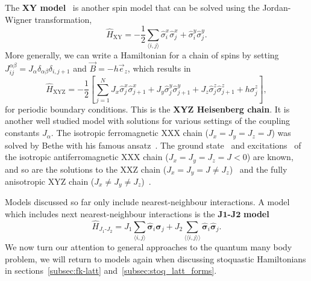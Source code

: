 The \textbf{XY model}~\cite{lieb1961two} is another spin model that can be solved using the Jordan-Wigner transformation,
\begin{equation}
	\label{eq:h-xy}
\hat H_{\text{XY}}=-\frac{1}{2} \sum_{\langle i, j\rangle} \hat\sigma_{i}^{x} \hat\sigma_{j}^{x}+\hat\sigma_{i}^{y} \hat\sigma_{j}^{y}.
\end{equation}
More generally, we can write a Hamiltonian for a chain of spins by setting $J_{i j}^{\alpha \beta} = J_\alpha \delta_{\alpha \beta} \delta_{i, j+1}$ and $\vec{B} = -h \vec{e}_z$, which results in
\begin{equation}
	\label{eq:h-xyz}
	\hat H_{\text{XYZ}}= -\frac{1}{2}\left[ \sum_{j=1}^{N}J_{x} \hat \sigma_{j}^{x} \hat \sigma_{j+1}^{x}+J_{y} \hat \sigma_{j}^{y} \hat \sigma_{j+1}^{y}+J_{z} \hat \sigma_{j}^{z} \hat \sigma_{j+1}^{z} + h \sigma_{j}^{z}
	\right],
\end{equation}
for periodic boundary conditions. This is the \textbf{XYZ Heisenberg chain}. It is another well studied model with solutions for various settings of the coupling constants $J_\alpha$. The isotropic ferromagnetic XXX chain ($J_x = J_y = J_z = J$) was solved by Bethe with his famous ansatz~\cite{bethe1931theorie}. The ground state~\cite{hulthen1938austauschproblem} and excitations~\cite{des1962spin} of the isotropic antiferromagnetic XXX chain ($J_x = J_y = J_z = J < 0$) are known, and so are the solutions to the XXZ chain ($J_x = J_y = J \neq J_z$)~\cite{yang1966three, yang1966one, yang1966two} and the fully anisotropic XYZ chain ($J_x \neq J_y \neq J_z$)~\cite{baxter1972one}. 

Models discussed so far only include nearest-neighbour interactions. A model which includes next nearest-neighbour interactions is the $\mathbf{J1}$\textbf{-}$\mathbf{J2}$ \textbf{model}
\begin{equation}
	\label{eq:h-j1j2}
	\hat H_{J_1\text{-}J_2} = J_1 \sum_{\langle i, j \rangle} \mathbf{\hat \sigma}_i \mathbf{\hat \sigma}_j + J_2 \sum_{\langle\langle i, j \rangle\rangle} \mathbf{\hat \sigma}_i \mathbf{\hat \sigma}_j.
\end{equation}
We now turn our attention to general approaches to the quantum many body problem, we will return to models again when discussing stoquastic Hamiltonians in sections~\ref{subsec:fk-latt} and~\ref{subsec:stoq_latt_forms}.

